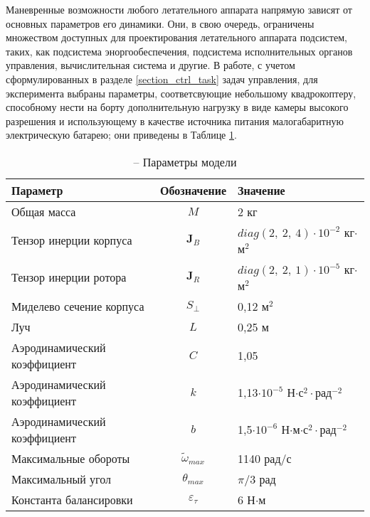 Маневренные возможности любого летательного аппарата напрямую зависят от основных параметров его динамики.
Они, в свою очередь, ограничены множеством доступных для проектирования летательного аппарата подсистем, таких, как подсистема эноргообеспечения, подсистема исполнительных органов управления, вычислительная система и другие. 
В работе, с учетом сформулированных в разделе \ref{section_ctrl_task} задач управления, для эксперимента выбраны параметры, соответсвующие небольшому квадрокоптеру, способному нести на борту дополнительную нагрузку в виде камеры высокого разрешения и использующему в качестве источника питания малогабаритную электрическую батарею; они приведены в Таблице \ref{tb:params_table}.
\begin{table}[h!]
	\centering
	\caption{ -- Параметры модели}\label{tb:params_table} 
	\begin{tabular}{lcl}
		\hline
		Параметр & Обозначение & Значение  \\\hline
		Общая масса & $M$ & 2 кг  \\
		Тензор инерции корпуса & $\bm J_B$ & $diag(2,\ 2,\ 4)\cdot{10^{-2}}$ кг$\cdot$м$^2$  \\
		Тензор инерции ротора & $\bm J_R$ & $diag(2,\ 2,\ 1)\cdot{10^{-5}}$ кг$\cdot$м$^2$  \\
		Миделево сечение корпуса & $S_{\perp}$ & 0,12 м$^2$ \\
		Луч & $L$ & 0,25 м \\
		Аэродинамический коэффициент & $C$ & 1,05\\
		Аэродинамический коэффициент & $k$ & 1,13$\cdot 10^{-5}$ Н$\cdot$с$^2\cdot$рад$^{-2}$ \\		
		Аэродинамический коэффициент & $b$ & 1,5$\cdot 10^{-6}$ Н$\cdot$м$\cdot$с$^2\cdot$рад$^{-2}$ \\		
		Максимальные обороты & $\tilde \omega_{max}$ & 1140 рад/с \\		
		Максимальный угол & $\theta_{max}$ & ${\pi}/{3}$ рад \\
		Константа балансировки & $\varepsilon_\tau$ &6 Н$\cdot$м \\
		\hline
	\end{tabular}
\end{table}

